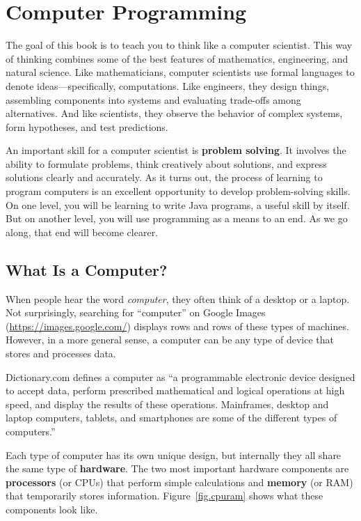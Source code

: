 \chapter{Computer Programming}
\label{theway}

The goal of this book is to teach you to think like a computer scientist.
This way of thinking combines some of the best features of mathematics, engineering, and natural science.
Like mathematicians, computer scientists use formal languages to denote ideas---specifically, computations.
Like engineers, they design things, assembling components into systems and evaluating trade-offs among alternatives.
And like scientists, they observe the behavior of complex systems, form hypotheses, and test predictions.


An important skill for a computer scientist is {\bf problem solving}.
It involves the ability to formulate problems, think creatively about solutions, and express solutions clearly and accurately.
As it turns out, the process of learning to program computers is an excellent opportunity to develop problem-solving skills.
On one level, you will be learning to write Java programs, a useful skill by itself.
But on another level, you will use programming as a means to an end.
As we go along, that end will become clearer.


\section{What Is a Computer?}

When people hear the word {\em computer}, they often think of a desktop or a laptop.
Not surprisingly, searching for ``computer'' on Google Images (\url{https://images.google.com/}) displays rows and rows of these types of machines.
However, in a more general sense, a computer can be any type of device that stores and processes data.

Dictionary.com defines a computer as ``a programmable electronic device designed to accept data, perform prescribed mathematical and logical operations at high speed, and display the results of these operations.
Mainframes, desktop and laptop computers, tablets, and smartphones are some of the different types of computers.''


Each type of computer has its own unique design, but internally they all share the same type of {\bf hardware}.
The two most important hardware components are {\bf processors} (or CPUs) that perform simple calculations and {\bf memory} (or RAM) that temporarily stores information.
Figure~\ref{fig.cpuram} shows what these components look like.

